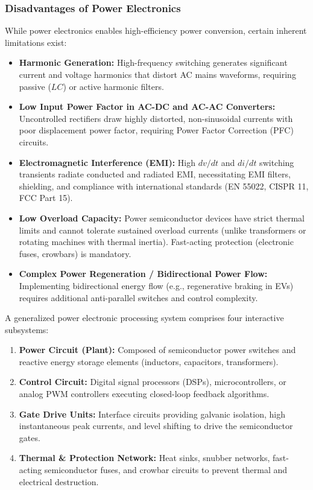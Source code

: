 \documentclass[11pt,a4paper]{article}
\begin{document}
\subsubsection{Disadvantages of Power Electronics}
While power electronics enables high-efficiency power conversion, certain inherent limitations exist:
\begin{itemize}[leftmargin=*]
  \item \textbf{Harmonic Generation:} High-frequency switching generates significant current and voltage harmonics that distort AC mains waveforms, requiring passive ($LC$) or active harmonic filters.
  \item \textbf{Low Input Power Factor in AC-DC and AC-AC Converters:} Uncontrolled rectifiers draw highly distorted, non-sinusoidal currents with poor displacement power factor, requiring Power Factor Correction (PFC) circuits.
  \item \textbf{Electromagnetic Interference (EMI):} High $dv/dt$ and $di/dt$ switching transients radiate conducted and radiated EMI, necessitating EMI filters, shielding, and compliance with international standards (EN 55022, CISPR 11, FCC Part 15).
  \item \textbf{Low Overload Capacity:} Power semiconductor devices have strict thermal limits and cannot tolerate sustained overload currents (unlike transformers or rotating machines with thermal inertia). Fast-acting protection (electronic fuses, crowbars) is mandatory.
  \item \textbf{Complex Power Regeneration / Bidirectional Power Flow:} Implementing bidirectional energy flow (e.g., regenerative braking in EVs) requires additional anti-parallel switches and control complexity.
\end{itemize}

A generalized power electronic processing system comprises four interactive subsystems:
\begin{enumerate}[leftmargin=*]
  \item \textbf{Power Circuit (Plant):} Composed of semiconductor power switches and reactive energy storage elements (inductors, capacitors, transformers).
  \item \textbf{Control Circuit:} Digital signal processors (DSPs), microcontrollers, or analog PWM controllers executing closed-loop feedback algorithms.
  \item \textbf{Gate Drive Units:} Interface circuits providing galvanic isolation, high instantaneous peak currents, and level shifting to drive the semiconductor gates.
  \item \textbf{Thermal \& Protection Network:} Heat sinks, snubber networks, fast-acting semiconductor fuses, and crowbar circuits to prevent thermal and electrical destruction.
\end{enumerate}
\end{document}
